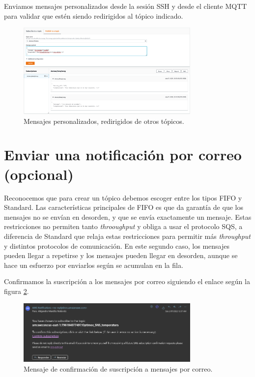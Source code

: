 \documentclass[10pt]{article}
\begin{document}
Enviamos mensajes personalizados desde la sesión SSH y desde el cliente MQTT para validar que estén siendo redirigidos al tópico indicado.

\begin{figure}[H]
    \centering
    \includegraphics[width=0.8\textwidth]{Images/AWS_consola_mensaje_propio.png}
    \caption{Mensajes personalizados, redirigidos de otros tópicos.}
    \label{fig:mensajes_personalizados_redirigidos_de_otros_topicos}
\end{figure}


\section{Enviar una notificación por correo (opcional)}

Reconocemos que para crear un tópico debemos escoger entre los tipos FIFO y Standard. Las características principales de FIFO es que da garantía de que los mensajes no se envían en desorden, y que se envía exactamente un mensaje. Estas restricciones no permiten tanto \textit{throoughput} y obliga a usar el protocolo SQS, a diferencia de Standard que relaja estas restricciones para permitir más \textit{throughput} y distintos protocolos de comunicación. En este segundo caso, los mensajes pueden llegar a repetirse y los mensajes pueden llegar en desorden, aunque se hace un esfuerzo por enviarlos según se acumulan en la fila.

Confirmamos la suscripción a los mensajes por correo siguiendo el enlace según la figura \ref{fig:suscripcion_correo}.

\begin{figure}[H]
    \centering
    \includegraphics[width=0.8\textwidth]{Images/Correo_confirmacion_suscripcion.png}
    \caption{Mensaje de confirmación de suscripción a mensajes por correo.}
    \label{fig:suscripcion_correo}
\end{figure}
\end{document}
